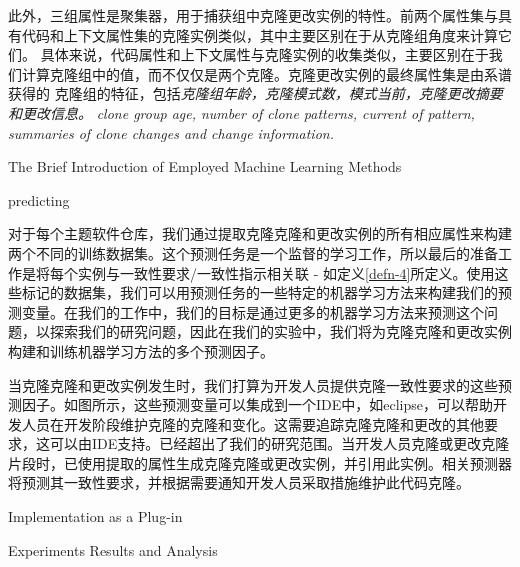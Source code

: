 此外，三组属性是聚集器，用于捕获组中克隆更改实例的特性。前两个属性集与具有代码和上下文属性集的克隆实例类似，其中主要区别在于从克隆组角度来计算它们。
具体来说，代码属性和上下文属性与克隆实例的收集类似，主要区别在于我们计算克隆组中的值，而不仅仅是两个克隆。克隆更改实例的最终属性集是由系谱获得的
克隆组的特征，包括{\em 克隆组年龄，克隆模式数，模式当前，克隆更改摘要和更改信息。}
{\em clone group age, number of clone patterns, current of pattern, summaries of clone changes and change information.}



{The Brief Introduction of Employed Machine Learning Methods}



{predicting}

对于每个主题软件仓库，我们通过提取克隆克隆和更改实例的所有相应属性来构建两个不同的训练数据集。这个预测任务是一个监督的学习工作，所以最后的准备工作是将每个实例与一致性要求/一致性指示相关联 - 如定义\ref {defn-4}所定义。使用这些标记的数据集，我们可以用预测任务的一些特定的机器学习方法来构建我们的预测变量。在我们的工作中，我们的目标是通过更多的机器学习方法来预测这个问题，以探索我们的研究问题，因此在我们的实验中，我们将为克隆克隆和更改实例构建和训练机器学习方法的多个预测因子。

当克隆克隆和更改实例发生时，我们打算为开发人员提供克隆一致性要求的这些预测因子。如图所示，这些预测变量可以集成到一个IDE中，如eclipse，可以帮助开发人员在开发阶段维护克隆的克隆和变化。这需要追踪克隆克隆和更改的其他要求，这可以由IDE支持。已经超出了我们的研究范围。当开发人员克隆或更改克隆片段时，已使用提取的属性生成克隆克隆或更改实例，并引用此实例。相关预测器将预测其一致性要求，并根据需要通知开发人员采取措施维护此代码克隆。

{Implementation as a Plug-in}


{Experiments Results and Analysis}

